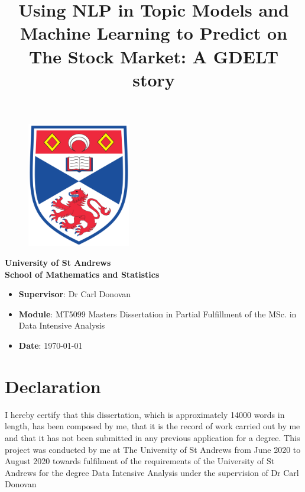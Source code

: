 \documentclass[a4paper]{article}
\begin{document}
\title{Using NLP in Topic Models and Machine Learning to Predict on The Stock Market: A GDELT story}
\author{}
\date{}
 \thispagestyle{empty}
	
	\begin{titlepage}
		\vspace{\fill}
		\maketitle
		 \thispagestyle{empty}
		\begin{figure}[H]
			\centering
			\includegraphics[width=0.4\textwidth]{Images/SchoolLogo.png}
		\end{figure}
		\begin{center}
			\Large\textbf{University of St Andrews}\\
			\vspace{1cm}
			\Large\textbf{School of Mathematics and Statistics}
		\end{center}
		
		\vspace{\fill}
		\Large%
		\begin{itemize}
			\renewcommand\labelitemi{--}
			\item[] \textbf{Supervisor}: Dr Carl Donovan  
			\item[] \textbf{Module}: MT5099 Masters Dissertation in Partial Fulfillment of the MSc. in Data Intensive Analysis
			\item[] \textbf{Date}: \today
		\end{itemize}
		\vspace{\fill}
	\end{titlepage}



\section*{Declaration}
I hereby certify that this dissertation, which is approximately 14000 words in length, has been composed by me, that it is the record of work carried out by me and that it has not been submitted in any previous application for a degree. This project was conducted by me at The University of St Andrews from June 2020 to August 2020 towards fulfilment of the requirements of the University of St Andrews for the degree Data Intensive Analysis under the supervision of Dr Carl Donovan
\end{document}
